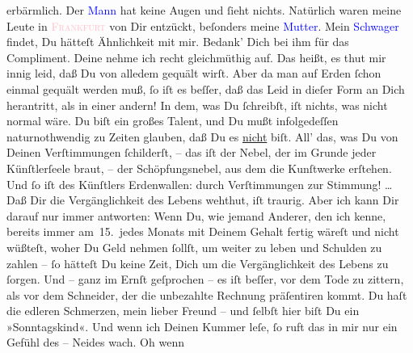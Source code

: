                erbärmlich. Der \textcolor{blue}{Mann}{} hat
               keine Augen und ſieht nichts.\pend
           \pstart
           {\pb}Natürlich waren meine Leute in \textsc{\textcolor{pink}{Frankfurt}{}\ledrightnote{\textcolor{pink}{Frankfurt am Main}}} von Dir entzückt, beſonders meine \textcolor{blue}{Mutter}{}. Mein \textcolor{blue}{Schwager}{} findet, Du hätteſt Ähnlichkeit mit mir. Bedank’ Dich
               bei ihm für das Compliment.\pend
           \pstart
           Deine \label{K_L02765-4v}\label{K_L02765-4h} nehme ich recht gleichmüthig auf. Das heißt, es thut mir innig leid, daß Du
               von alledem gequält wirſt. Aber da man auf  Erden ſchon einmal gequält werden muß, ſo iſt es beſſer, daß das Leid
               in dieſer Form an Dich herantritt, als in einer andern! In dem, was Du
               ſchreibſt, iſt nichts, was nicht normal wäre. Du biſt ein großes Talent, und Du mußt
               infolgedeſſen naturnothwendig zu Zeiten glauben, daß Du es \uline{nicht} biſt. All’ das, was Du von Deinen Verſtimmungen ſchilderſt, – das iſt
               der  Nebel, der im Grunde jeder Künſtlerſeele braut,
                   – der Schöpfungsnebel, aus dem die Kunſtwerke
               erſtehen. Und ſo iſt des Künſtlers Erdenwallen: durch Verſtimmungen zur Stimmung! {\dots} Daß Dir {\pb}die
               Vergänglichkeit des Lebens wehthut, iſt traurig. Aber ich kann Dir darauf nur immer
               antworten: Wenn Du, wie jemand Anderer, den ich kenne, bereits immer am 15. jedes
               Monats mit Deinem Gehalt fertig wäreſt und nicht wüßteſt, woher Du Geld nehmen
               ſollſt, um weiter zu leben und Schulden zu zahlen – ſo hätteſt Du keine Zeit, Dich um
               die Vergänglichkeit des Lebens zu ſorgen. Und – ganz im Ernſt geſprochen – es iſt
               beſſer, vor dem Tode zu zittern, als vor {\pb}dem
               Schneider, der die unbezahlte Rechnung präſentiren kommt. Du haſt die edleren
               Schmerzen, mein lieber Freund – und ſelbſt hier biſt Du ein »Sonntagskind«. Und wenn
               ich Deinen Kummer leſe, ſo ruft das in mir nur ein Gefühl des – Neides wach. Oh wenn
